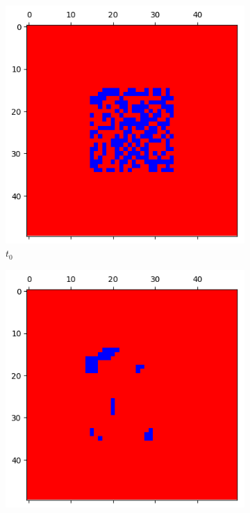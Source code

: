 \documentclass[letterpaper]{article}
\begin{document}
\begin{figure}[H]
    \begin{subfigure}{.33\textwidth}
      \centering
      \includegraphics[width=1\linewidth]{images/assign2/part31-defect/t0}
      \caption{$t_{0}$}
    \end{subfigure}
    \begin{subfigure}{.33\textwidth}
      \centering
      \includegraphics[width=1\linewidth]{images/assign2/part31-defect/t1}

\end{subfigure}
\end{figure}
\end{document}
